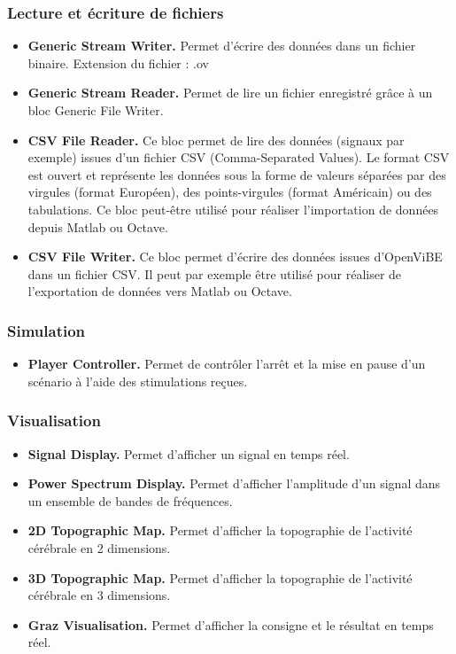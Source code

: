 \subsubsection{Lecture et écriture de fichiers}
\label{Subsubsection : 5.Lecture et écriture de fichiers}
\begin{itemize}
	\smallbreak
	\item \textbf{Generic Stream Writer.} Permet d'écrire des données dans un fichier binaire. Extension du fichier : .ov
	\smallbreak
	\item \textbf{Generic Stream Reader.} Permet de lire un fichier enregistré grâce à un bloc Generic File Writer.
	\item \textbf{CSV File Reader.} Ce bloc permet de lire des données (signaux par exemple) issues d'un fichier CSV (Comma-Separated Values). Le format  CSV est ouvert et représente les données sous la forme de valeurs séparées par des virgules (format Européen), des points-virgules (format Américain) ou des tabulations. Ce bloc peut-être utilisé pour réaliser l'importation de données depuis Matlab ou Octave. 
	\smallbreak
	\item \textbf{CSV File Writer.} Ce bloc permet d'écrire des données issues d'OpenViBE dans un fichier CSV. Il peut par exemple être utilisé pour réaliser de l'exportation de données vers Matlab ou Octave.
\end{itemize}
\subsubsection{Simulation}
\label{Subsubsection : 5.Simulation}
\begin{itemize}
	\smallbreak
	\item\textbf{Player Controller.} Permet de contrôler l'arrêt et la mise en pause d'un scénario à l'aide des stimulations reçues. 
\end{itemize}
\subsubsection{Visualisation}
\label{Subsubsection : 5.Visualisation}
\begin{itemize}
	\smallbreak
	\item\textbf{Signal Display.} Permet d'afficher un signal en temps réel.
	\smallbreak
	\item\textbf{Power Spectrum Display.} Permet d'afficher l'amplitude d'un signal dans un ensemble de bandes de fréquences.
	\smallbreak
	\item \textbf{2D Topographic Map.} Permet d'afficher la topographie de l'activité cérébrale en 2 dimensions.
	\smallbreak
	\item \textbf{3D Topographic Map.} Permet d'afficher la topographie de l'activité cérébrale en 3 dimensions.
	\smallbreak
	\item\textbf{Graz Visualisation.} Permet d'afficher la consigne et le résultat en temps réel.
\end{itemize}
